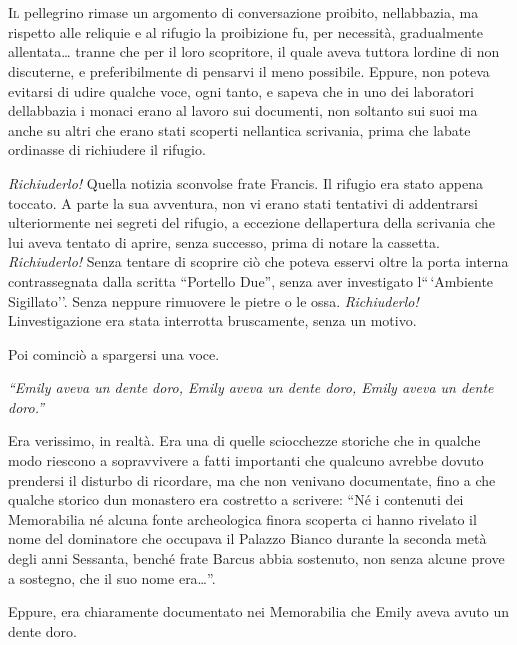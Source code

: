 	\chapter{\phantom{title}}

\lettrine{I}{l} pellegrino rimase un argomento di conversazione proibito,
nell\textquotesingle abbazia, ma rispetto alle reliquie e al rifugio la
proibizione fu, per necessità, gradualmente allentata\ldots{} tranne che
per il loro scopritore, il quale aveva tuttora l\textquotesingle ordine
di non discuterne, e preferibilmente di pensarvi il meno possibile.
Eppure, non poteva evitarsi di udire qualche voce, ogni tanto, e sapeva
che in uno dei laboratori dell\textquotesingle abbazia i monaci erano al
lavoro sui documenti, non soltanto sui suoi ma anche su altri che erano
stati scoperti nell\textquotesingle antica scrivania, prima che
l\textquotesingle abate ordinasse di richiudere il rifugio.

\emph{Richiuderlo!} Quella notizia sconvolse frate Francis. Il rifugio
era stato appena toccato. A parte la sua avventura, non vi erano stati
tentativi di addentrarsi ulteriormente nei segreti del rifugio, a
eccezione dell\textquotesingle apertura della scrivania che lui aveva
tentato di aprire, senza successo, prima di notare la cassetta.
\emph{Richiuderlo!} Senza tentare di scoprire ciò che poteva esservi
oltre la porta interna contrassegnata dalla scritta ``Portello Due'',
senza aver investigato l``\,`Ambiente Sigillato''. Senza neppure
rimuovere le pietre o le ossa. \emph{Richiuderlo!}
L\textquotesingle investigazione era stata interrotta bruscamente, senza
un motivo.

Poi cominciò a spargersi una voce.

\emph{``Emily aveva un dente d\textquotesingle oro, Emily aveva un dente
	d\textquotesingle oro, Emily aveva un dente d\textquotesingle oro.''}

Era verissimo, in realtà. Era una di quelle sciocchezze storiche che in
qualche modo riescono a sopravvivere a fatti importanti che qualcuno
avrebbe dovuto prendersi il disturbo di ricordare, ma che non venivano
documentate, fino a che qualche storico d\textquotesingle un monastero
era costretto a scrivere: ``Né i contenuti dei Memorabilia né alcuna
fonte archeologica finora scoperta ci hanno rivelato il nome del
dominatore che occupava il Palazzo Bianco durante la seconda metà degli
anni Sessanta, benché frate Barcus abbia sostenuto, non senza alcune
prove a sostegno, che il suo nome era\ldots''.

Eppure, era chiaramente documentato nei Memorabilia che Emily aveva
avuto un dente d\textquotesingle oro.


